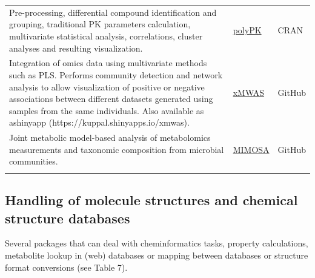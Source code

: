\documentclass[]{article}
\begin{document}
\begin{longtable}[t]{>{\raggedright\arraybackslash}p{30em}>{\raggedright\arraybackslash}p{10em}>{\raggedright\arraybackslash}p{3em}}
\rowcolor{gray!6}  Pre-processing, differential compound identification and grouping, traditional PK parameters calculation, multivariate statistical analysis, correlations, cluster analyses and resulting visualization. & \href{https://cran.r-project.org/package=polyPK}{polyPK} & CRAN\\
Integration of omics data using multivariate methods such as PLS. Performs community detection and network analysis to allow visualization of positive or negative associations between different datasets generated using samples from the same individuals. Also available as ashinyapp (https://kuppal.shinyapps.io/xmwas). & \href{https://github.com/kuppal2/xMWAS}{xMWAS} & GitHub\\
\rowcolor{gray!6}  Joint metabolic model-based analysis of metabolomics measurements and taxonomic composition from microbial communities. & \href{https://github.com/borenstein-lab/MIMOSA/tree/master/mimosa}{MIMOSA} & GitHub\\*
\end{longtable}

\newpage

\hypertarget{handling-of-molecule-structures-and-chemical-structure-databases}{%
\subsection{Handling of molecule structures and chemical structure databases}\label{handling-of-molecule-structures-and-chemical-structure-databases}}

Several packages that can deal with cheminformatics tasks, property calculations, metabolite lookup in (web) databases or mapping between databases or structure format conversions (see Table 7).
\end{document}
